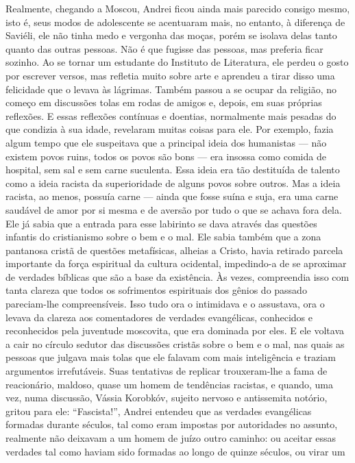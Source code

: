 Realmente, chegando a Moscou, Andrei ficou ainda mais parecido consigo
mesmo, isto é, seus modos de adolescente se acentuaram mais, no entanto,
à diferença de Saviéli, ele não tinha medo e vergonha das moças, porém
se isolava delas tanto quanto das outras pessoas. Não é que fugisse das
pessoas, mas preferia ficar sozinho. Ao se tornar um estudante do
Instituto de Literatura, ele perdeu o gosto por escrever versos, mas
refletia muito sobre arte e aprendeu a tirar disso uma felicidade que o
levava às lágrimas. Também passou a se ocupar da religião, no começo em
discussões tolas em rodas de amigos e, depois, em suas próprias
reflexões. E essas reflexões contínuas e doentias, normalmente mais
pesadas do que condizia à sua idade, revelaram muitas coisas para ele.
Por exemplo, fazia algum tempo que ele suspeitava que a principal ideia
dos humanistas --- não existem povos ruins, todos os povos são bons ---
era insossa como comida de hospital, sem sal e sem carne suculenta. Essa
ideia era tão destituída de talento como a ideia racista da
superioridade de alguns povos sobre outros. Mas a ideia racista, ao
menos, possuía carne --- ainda que fosse suína e suja, era uma carne
saudável de amor por si mesma e de aversão por tudo o que se achava fora
dela. Ele já sabia que a entrada para esse labirinto se dava através das
questões infantis do cristianismo sobre o bem e o mal. Ele sabia também
que a zona pantanosa cristã de questões metafísicas, alheias a Cristo,
havia retirado parcela importante da força espiritual da cultura
ocidental, impedindo-a de se aproximar de verdades bíblicas que são a
base da existência. Às vezes, compreendia isso com tanta clareza que
todos os sofrimentos espirituais dos gênios do passado pareciam-lhe
compreensíveis. Isso tudo ora o intimidava e o assustava, ora o levava
da clareza aos comentadores de verdades evangélicas, conhecidos e
reconhecidos pela juventude moscovita, que era dominada por eles. E ele
voltava a cair no círculo sedutor das discussões cristãs sobre o bem e o
mal, nas quais as pessoas que julgava mais tolas que ele falavam com
mais inteligência e traziam argumentos irrefutáveis. Suas tentativas de
replicar trouxeram-lhe a fama de reacionário, maldoso, quase um homem de
tendências racistas, e quando, uma vez, numa discussão, Vássia Korobkóv,
sujeito nervoso e antissemita notório, gritou para ele: ``Fascista!'',
Andrei entendeu que as verdades evangélicas formadas durante séculos,
tal como eram impostas por autoridades no assunto, realmente não
deixavam a um homem de juízo outro caminho: ou aceitar essas verdades
tal como haviam sido formadas ao longo de quinze séculos, ou virar um
